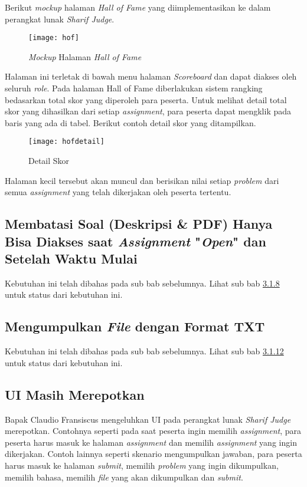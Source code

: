 Berikut \textit{mockup} halaman \textit{Hall of Fame} yang diimplementasikan ke dalam perangkat lunak \textit{Sharif Judge}.
\begin{figure}[H]
	\centering  
	\texttt{[image: hof]}  
	\caption[\textit{Mockup} Halaman\textit{ Hall of Fame}]{\textit{Mockup} Halaman \textit{Hall of Fame}} 
	\label{fig:hof} 
\end{figure}
Halaman ini terletak di bawah menu halaman \textit{Scoreboard} dan dapat diakses oleh seluruh \textit{role}. Pada halaman Hall of Fame diberlakukan sistem rangking bedasarkan total skor yang diperoleh para peserta. Untuk melihat detail total skor yang dihasilkan dari setiap \textit{assignment}, para peserta dapat mengklik pada baris yang ada di tabel. Berikut contoh detail skor yang ditampilkan.
\begin{figure}[H]
	\centering  
	\texttt{[image: hofdetail]}  
	\caption[Detail Skor]{Detail Skor} 
	\label{fig:hofdetail} 
\end{figure}
Halaman kecil tersebut akan muncul dan berisikan nilai setiap \textit{problem} dari semua \textit{assignment} yang telah dikerjakan oleh peserta tertentu.

\subsection{Membatasi Soal (Deskripsi \& PDF) Hanya Bisa Diakses saat \textit{Assignment} "\textit{Open}" dan Setelah Waktu Mulai}
Kebutuhan ini telah dibahas pada sub bab sebelumnya. Lihat sub bab \hyperref[subsec:membatasisoal]{3.1.8} untuk status dari kebutuhan ini.

\subsection{Mengumpulkan \textit{File} dengan Format TXT}
Kebutuhan ini telah dibahas pada sub bab sebelumnya. Lihat sub bab \hyperref[subsec:filetxt]{3.1.12} untuk status dari kebutuhan ini.

\subsection{UI Masih Merepotkan}
Bapak Claudio Fransiscus mengeluhkan UI pada perangkat lunak \textit{Sharif Judge} merepotkan. Contohnya seperti pada saat peserta ingin memilih \textit{assignment}, para peserta harus masuk ke halaman \textit{assignment} dan memilih \textit{assignment} yang ingin dikerjakan. Contoh lainnya seperti skenario mengumpulkan jawaban, para peserta harus masuk ke halaman \textit{submit}, memilih \textit{problem} yang ingin dikumpulkan, memilih bahasa, memilih \textit{file} yang akan dikumpulkan dan \textit{submit}.

